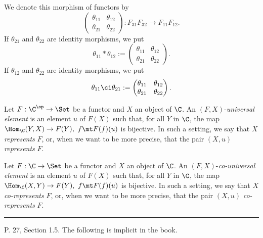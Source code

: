 \documentclass[12pt]{article}
\theoremstyle{remark}
\theoremstyle{definition}
\begin{document}
\begin{nota}
We denote this morphism of functors by
$$
\begin{pmatrix}
\theta_{11}&\theta_{12}\\ 
\theta_{21}&\theta_{22}
\end{pmatrix}:F_{31}F_{32}\to F_{11}F_{12}.
$$ 
If $\theta_{21}$ and $\theta_{22}$ are identity morphisms, we put 
$$
\theta_{11}*\theta_{12}:=
\begin{pmatrix}
\theta_{11}&\theta_{12}\\ 
\theta_{21}&\theta_{22}
\end{pmatrix}.
$$ 
If $\theta_{12}$ and $\theta_{22}$ are identity morphisms, we put 
$$
\theta_{11}\ci\theta_{21}:=
\begin{pmatrix}
\theta_{11}&\theta_{12}\\ 
\theta_{21}&\theta_{22}
\end{pmatrix}.
$$ 
\end{nota}

\begin{df} 
Let $F:\C^{\op}\to\Set$ be a functor and $X$ an object of $\C$. An $(F,X)$-\emph{universal element} is an element $u$ of $F(X)$ such that, for all $Y$ in $\C$, the map $\Hom_\C(Y,X)\to F(Y),\ f\mt F(f)(u)$ is bijective. In such a setting, we say that $X$ \emph{represents} $F$, or, when we want to be more precise, that the pair $(X,u)$ \emph{represents} $F$. 
\end{df}

\begin{df} 
Let $F:\C\to\Set$ be a functor and $X$ an object of $\C$. An $(F,X)$-\emph{co-universal element} is an element $u$ of $F(X)$ such that, for all $Y$ in $\C$, the map $\Hom_\C(X,Y)\to F(Y),\ f\mt F(f)(u)$ is bijective. In such a setting, we say that $X$ \emph{co-represents} $F$, or, when we want to be more precise, that the pair $(X,u)$ \emph{co-represents} $F$. 
\end{df}

\hrule


P. 27, Section 1.5. The following is implicit in the book.
\end{document}
